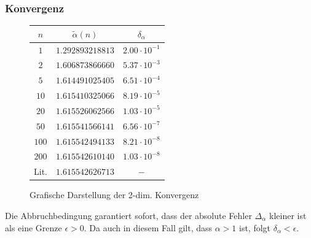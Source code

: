 \documentclass[10pt,a4paper]{article}
\begin{document}
\subsubsection{Konvergenz}

\vspace{-10pt}
\begin{figure}[h]
\begin{minipage}[c]{0.5\textwidth}
\captionsetup{type=figure}
\begin{center}

\caption{Grafische Darstellung der 2-dim. Konvergenz}
\label{plotkonvergenz2d}
\end{center}
\end{minipage}
\begin{minipage}[c]{0.5\textwidth}
\captionsetup{type=table}
\begin{center}
\begin{tabular}{c|c|c}
\rule[-1ex]{0pt}{2.5ex} $n$ & $\tilde{\alpha}(n)$ & $\delta_\alpha$ \\ 
\hline 
\rule[-1ex]{0pt}{2.5ex} $1$ & $1.292893218813$ & $2.00\cdot10^{-1}$ \\ 
\hline 
\rule[-1ex]{0pt}{2.5ex} $2$ & $1.606873866660$ & $5.37\cdot10^{-3}$ \\ 
\hline
\rule[-1ex]{0pt}{2.5ex} $5$ & $1.614491025405$ & $6.51\cdot10^{-4}$ \\ 
\hline 
\rule[-1ex]{0pt}{2.5ex} $10$ & $1.615410325066$ & $8.19\cdot10^{-5}$ \\ 
\hline 
\rule[-1ex]{0pt}{2.5ex} $20$ & $1.615526062566$ & $1.03\cdot10^{-5}$ \\ 
\hline 
\rule[-1ex]{0pt}{2.5ex} $50$ & $1.615541566141$ & $6.56\cdot10^{-7}$ \\
\hline
\rule[-1ex]{0pt}{2.5ex} $100$ & $1.615542494133$ & $8.21\cdot10^{-8}$ \\ 
\hline
\rule[-1ex]{0pt}{2.5ex} $200$ & $1.615542610140$ & $1.03\cdot10^{-8}$ \\ 
\hline
\rule[1ex]{0pt}{2.5ex} Lit.   & $1.615542626713$ & $ - $
\end{tabular}
\label{tab:konvergenz2d}
\end{center}
\end{minipage}
\end{figure}

Die Abbruchbedingung garantiert sofort, dass der absolute Fehler $\Delta_\alpha$ kleiner
ist als eine Grenze $\epsilon > 0$. Da auch in diesem Fall gilt, dass $\alpha > 1$ ist,
folgt $\delta_\alpha < \epsilon$.
\end{document}
